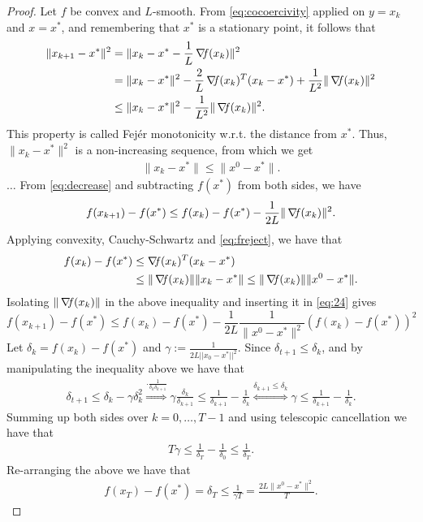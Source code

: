 \documentclass[10pt,a4paper]{article}
\begin{document}
\begin{proof}
	Let $f$ be convex and $L$-smooth. From \eqref{eq:cocoercivity} applied on $y=x_k$ and $x=x^*$, and remembering that $x^*$ is a stationary point, it follows that
	\begin{align*}
		\|x_{k+1} - x^*\|^2 &= \|x_k - x^* - \frac{1}{L}\operatorname*{\mathit{\nabla \!f}}(x_k)\|^2\\
		&= \|x_k - x^*\|^2 - \frac{2}{L} \operatorname*{\mathit{\nabla \!f}}(x_k)^T(x_k - x^*) + \frac{1}{L^2}\|\operatorname*{\mathit{\nabla \!f}}(x_k)\|^2\\
		&\leq \|x_k - x^*\|^2 - \frac{1}{L^2}\|\operatorname*{\mathit{\nabla \!f}}(x_k)\|^2.
	\end{align*}
This property is called Fej\'er monotonicity w.r.t. the distance from $x^*$. Thus, $\|x_k - x^*\|^2$ is a non-increasing sequence, from which we get 
	\begin{align}\label{eq:freject}
		\|x_k - x^*\| \leq \|x^0 - x^*\|.
	\end{align}
$\dots$
	From \eqref{eq:decrease} and subtracting $f(x^*)$ from both sides, we have
	\begin{align}\label{eq:24}
		f(x_{k+1}) - f(x^*) \leq f(x_k) - f(x^*) - \frac{1}{2L}\|\operatorname*{\mathit{\nabla \!f}}(x_k)\|^2.
	\end{align}
	Applying convexity, Cauchy-Schwartz and \eqref{eq:freject}, we have that
	\begin{equation*}
		\begin{split}
			f(x_k) - f(x^*) &\leq \operatorname*{\mathit{\nabla \!f}}(x_k)^T(x_k - x^*)\\
			&\leq \|\operatorname*{\mathit{\nabla \!f}}(x_k)\|\|x_k - x^*\| \leq \|\operatorname*{\mathit{\nabla \!f}}(x_k)\|\|x^0 - x^*\|.
		\end{split}
	\end{equation*}
	Isolating $\|\operatorname*{\mathit{\nabla \!f}}(x_k)\|$ in the above inequality and inserting it in \eqref{eq:24} gives
	\begin{equation*}
		f(x_{k+1}) - f(x^*) \leq f(x_k) - f(x^*) - \frac{1}{2L}\frac{1}{\|x^0 - x^*\|^2}(f(x_k) - f(x^*))^2
	\end{equation*}
	Let $\delta_k = f(x_k) - f(x^*)$ and $\gamma:=\frac{1}{2L||x_0-x^*||^2}$. Since $\delta_{t+1} \leq \delta_k$, and by manipulating the inequality above we have that
	\begin{align*}
		\delta_{t+1} \leq \delta_k - \gamma\delta_k^2 \overset{\cdot\frac{1}{\delta_k\delta_{k+1}}}{\Rightarrow} \gamma\frac{\delta_k}{\delta_{k+1}} \leq \frac{1}{\delta_{k+1}} - \frac{1}{\delta_k} \overset{\delta_{k+1}\leq\delta_k}{\Leftrightarrow} \gamma \leq \frac{1}{\delta_{k+1}} - \frac{1}{\delta_k}.
	\end{align*}
	Summing up both sides over $k = 0, \ldots, T - 1$ and using telescopic cancellation we have that
	\begin{align*}
		T\gamma \leq \frac{1}{\delta_T} - \frac{1}{\delta_0} \leq \frac{1}{\delta_T}.
	\end{align*}
Re-arranging the above we have that
	\begin{align*}
		f(x_T) - f(x^*) = \delta_T \leq \frac{1}{\gamma T} = \frac{2L\|x^0 - x^*\|^2}{T}.
	\end{align*}
\end{proof}
\end{document}
